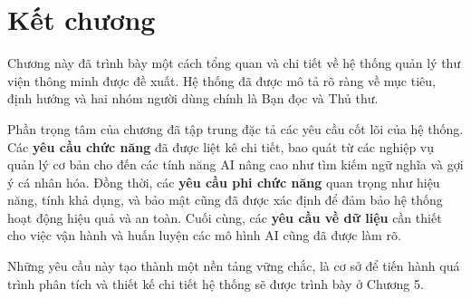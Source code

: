 \section{Kết chương}
\label{sec:KetChuong4}

Chương này đã trình bày một cách tổng quan và chi tiết về hệ thống quản lý thư viện thông minh được đề xuất. Hệ thống đã được mô tả rõ ràng về mục tiêu, định hướng và hai nhóm người dùng chính là Bạn đọc và Thủ thư.

Phần trọng tâm của chương đã tập trung đặc tả các yêu cầu cốt lõi của hệ thống. Các \textbf{yêu cầu chức năng} đã được liệt kê chi tiết, bao quát từ các nghiệp vụ quản lý cơ bản cho đến các tính năng AI nâng cao như tìm kiếm ngữ nghĩa và gợi ý cá nhân hóa. Đồng thời, các \textbf{yêu cầu phi chức năng} quan trọng như hiệu năng, tính khả dụng, và bảo mật cũng đã được xác định để đảm bảo hệ thống hoạt động hiệu quả và an toàn. Cuối cùng, các \textbf{yêu cầu về dữ liệu} cần thiết cho việc vận hành và huấn luyện các mô hình AI cũng đã được làm rõ.

Những yêu cầu này tạo thành một nền tảng vững chắc, là cơ sở để tiến hành quá trình phân tích và thiết kế chi tiết hệ thống sẽ được trình bày ở Chương 5.